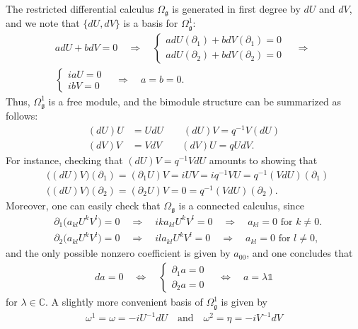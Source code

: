 \documentclass{amsart}
\newcommand{\complex}{\mathbb{C}}
\newcommand{\paraa}[1]{\big(#1\big)}
\newcommand{\spacearound}[1]{\quad#1\quad}
\newcommand{\equivalent}{\spacearound{\Leftrightarrow}}
\renewcommand{\implies}{\spacearound{\Rightarrow}}
\theoremstyle{definition}
\theoremstyle{remark}
\numberwithin{equation}{section}
\renewcommand{\mid}{\mathds{1}}
\renewcommand{\d}{\partial}
\newcommand{\qand}{\quad\text{and}\quad}
\newcommand{\g}{\mathfrak{g}}
\newcommand{\Omegag}[1]{\Omega^{#1}_{\g}}
\newcommand{\Omegaoneg}{\Omega^1_{\g}}
\begin{document}
The restricted differential calculus $\Omegag{}$ is generated in first
degree by $dU$ and $dV$, and we note that $\{dU,dV\}$ is a basis for
$\Omegaoneg$:
\begin{align*}
  &adU+bdV = 0\implies
  \begin{cases}
    adU(\d_1)+bdV(\d_1) = 0\\
    adU(\d_2)+bdV(\d_2) = 0
  \end{cases}\implies\\
  &
    \begin{cases}
      iaU = 0\\
      ibV = 0
    \end{cases}\implies
        a=b=0.
\end{align*}
Thus, $\Omegaoneg$ is a free module, and the bimodule structure can be summarized as follows:
\begin{equation}
  \begin{split}
    (dU)U &= UdU \qquad (dU)V = q^{-1}V(dU)\\
    (dV)V &= VdV \qquad (dV)U = qUdV.            
  \end{split}
\end{equation}
For instance, checking that $(dU)V=q^{-1}VdU$ amounts to showing that
\begin{align*}
  &\paraa{(dU)V}(\d_1) = (\d_1U)V = iUV = iq^{-1}VU=q^{-1}(VdU)(\d_1)\\
  &\paraa{(dU)V}(\d_2) = (\d_2U)V = 0 = q^{-1}(VdU)(\d_2).
\end{align*}
Moreover, one can easily check that $\Omegag{}$ is a connected
calculus, since
\begin{align*}
  &\d_1\paraa{a_{kl}U^kV^l} = 0\implies ika_{kl}U^kV^l = 0\implies
  a_{kl} = 0\text{ for }k\neq 0.\\
  &\d_2\paraa{a_{kl}U^kV^l} = 0\implies ila_{kl}U^kV^l = 0\implies
  a_{kl} = 0\text{ for }l\neq 0,
\end{align*}
and the only possible nonzero coefficient is given by $a_{00}$, and
one concludes that
\begin{align*}
  da = 0\equivalent
  \begin{cases}
    \d_1a = 0\\
    \d_2a = 0
  \end{cases}\equivalent
  a = \lambda\mid
\end{align*}
for $\lambda\in\complex$.  A slightly more convenient basis of
$\Omegaoneg$ is given by
\begin{align*}
  \omega^1 = \omega = -iU^{-1}dU\qand
  \omega^2 = \eta = -iV^{-1}dV
\end{align*}
\end{document}
